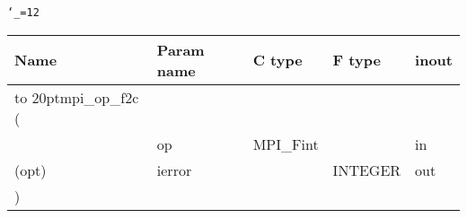 \begingroup\tt\catcode`\_=12
\begin{tabular}{lllll}
\toprule
\textrm{Name}&\textrm{Param name}&\textrm{C type}&\textrm{F type}&\textrm{inout}\\
\midrule
\hbox to 20pt{mpi_op_f2c (\hss} \\
&op&MPI_Fint&&in\\
(opt)&ierror&&INTEGER&out\\
)\\
\bottomrule
\end{tabular}
\endgroup

